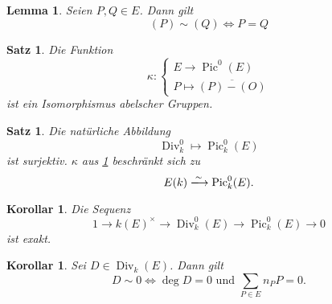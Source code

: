\documentclass{amsart}
\theoremstyle{plain}
\newtheorem{proposition}[subsection]{Satz}
\newtheorem{corollary}[subsection]{Korollar}
\newtheorem{lemma}[subsection]{Lemma}
\theoremstyle{definition}
\newcommand{\rightarrowiso}{\xlongrightarrow{\sim}}
\newcommand{\pic}{\operatorname{Pic}}
\newcommand{\divgrp}{\operatorname{Div}}
\begin{document}
\begin{lemma}
	Seien $P, Q \in E$. Dann gilt
	\begin{equation*}
		(P) \sim (Q) \Leftrightarrow P = Q
	\end{equation*}
\end{lemma}

\begin{proposition}
	\label{prop-isomorphism-pic}
	Die Funktion
	\begin{equation*}
		\kappa \colon \begin{cases}
			E \rightarrow \pic^0(E) \\
			P \mapsto \overline{(P) - (O)}
		\end{cases}
	\end{equation*}
	ist ein Isomorphismus abelscher Gruppen.
\end{proposition}

\begin{proposition}
	Die natürliche Abbildung
	\begin{equation*}
		\divgrp_k^0 \mapsto \pic_k^0(E)
	\end{equation*}
	ist surjektiv. $\kappa$ aus \ref{prop-isomorphism-pic} beschränkt sich zu 
	\begin{equation*}
		E(k) \rightarrowiso \pic_k^0(E).
	\end{equation*}
\end{proposition}

\begin{corollary}
	Die Sequenz
	\begin{equation*}
		1 \rightarrow k(E)^{\times} \rightarrow \divgrp_k^0(E) \rightarrow \pic_k^0(E) \rightarrow 0
	\end{equation*}
	ist exakt.
\end{corollary}

\begin{corollary}
	Sei $D \in \divgrp_k(E)$. Dann gilt
	\begin{equation*}
		D \sim 0 \Leftrightarrow \deg D = 0 \text{ und } \sum_{P \in E} n_P P = 0.
	\end{equation*}
\end{corollary}
\end{document}
